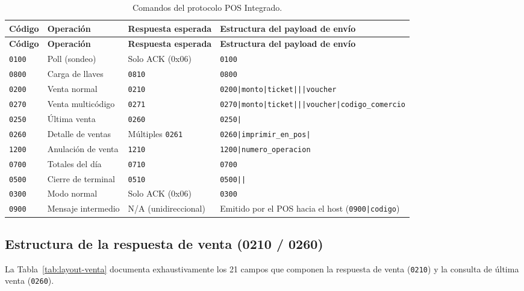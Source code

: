 \documentclass{../../plantilla/raysac-informe}
\begin{document}
\begin{longtable}{@{}p{1.4cm}p{3.8cm}p{3.2cm}p{6.0cm}@{}}
\caption{Comandos del protocolo POS Integrado.}\label{tab:comandos-integrado}\\
\toprule
\textbf{Código} & \textbf{Operación} & \textbf{Respuesta esperada} & \textbf{Estructura del payload de envío} \\
\midrule
\endfirsthead
\toprule
\textbf{Código} & \textbf{Operación} & \textbf{Respuesta esperada} & \textbf{Estructura del payload de envío} \\
\midrule
\endhead
\bottomrule
\endlastfoot
\texttt{0100} & Poll (sondeo) & Solo ACK (0x06) & \texttt{0100} \\
\texttt{0800} & Carga de llaves & \texttt{0810} & \texttt{0800} \\
\texttt{0200} & Venta normal & \texttt{0210} & \texttt{0200|monto|ticket|||voucher} \\
\texttt{0270} & Venta multicódigo & \texttt{0271} & \texttt{0270|monto|ticket|||voucher|codigo\_comercio} \\
\texttt{0250} & Última venta & \texttt{0260} & \texttt{0250|} \\
\texttt{0260} & Detalle de ventas & Múltiples \texttt{0261} & \texttt{0260|imprimir\_en\_pos|} \\
\texttt{1200} & Anulación de venta & \texttt{1210} & \texttt{1200|numero\_operacion} \\
\texttt{0700} & Totales del día & \texttt{0710} & \texttt{0700} \\
\texttt{0500} & Cierre de terminal & \texttt{0510} & \texttt{0500||} \\
\texttt{0300} & Modo normal & Solo ACK (0x06) & \texttt{0300} \\
\texttt{0900} & Mensaje intermedio & N/A (unidireccional) & Emitido por el POS hacia el host (\texttt{0900|codigo}) \\
\end{longtable}

\subsection{Estructura de la respuesta de venta (0210 / 0260)}
La Tabla~\ref{tab:layout-venta} documenta exhaustivamente los 21 campos que componen la respuesta de
venta (\texttt{0210}) y la consulta de última venta (\texttt{0260}).
\end{document}
